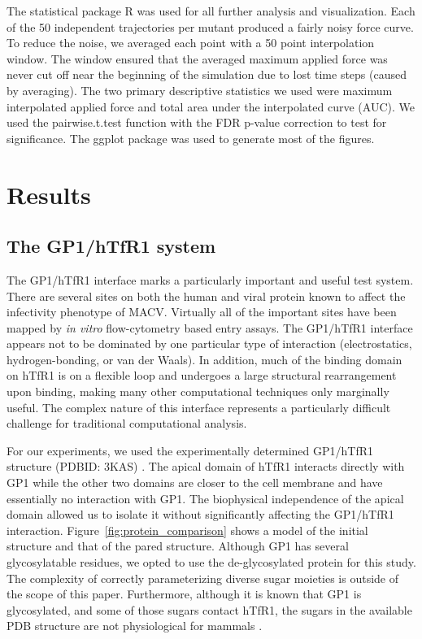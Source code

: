 \documentclass[12pt]{article} %
\providecommand{\DIFaddbegin}{} %
\providecommand{\DIFaddend}{} %
\providecommand{\DIFdelbegin}{} %
\providecommand{\DIFdelend}{} %
\begin{document}
The statistical package R was used for all further analysis and visualization. Each of the 50 independent trajectories per mutant produced a fairly noisy force curve. To reduce the noise, we averaged each point with a 50 point interpolation window. The window ensured that the averaged maximum applied force was never cut off near the beginning of the simulation due to lost time steps (caused by averaging). The two primary descriptive statistics we used were maximum interpolated applied force and total area under the interpolated curve (AUC). We used the pairwise.t.test function with the FDR p-value correction to test for significance. The ggplot \DIFdelbegin %
\DIFdelend \DIFaddbegin \citep{ggplot} \DIFaddend package was used to generate most of the figures. 

\section{Results}

\subsection{The GP1/hTfR1 system}
The GP1/hTfR1 interface marks a particularly important and useful test system. There are several sites on both the human and viral protein known to affect the infectivity phenotype of MACV. Virtually all of the important sites have been mapped by \textit{in vitro} flow-cytometry based entry assays. The GP1/hTfR1 interface appears not to be dominated by one particular type of interaction (electrostatics, hydrogen-bonding, or van der Waals). In addition, much of the binding domain on hTfR1 is on a flexible loop and undergoes a large structural rearrangement upon binding, making many other computational techniques \DIFdelbegin %
\DIFdelend \DIFaddbegin \citep{Grant2011,Kortemme2004} \DIFaddend only marginally useful. The complex nature of this interface represents a particularly difficult challenge for traditional computational analysis. 

For our experiments, we used the experimentally determined GP1/hTfR1 structure (PDBID: 3KAS) \DIFdelbegin %
\DIFdelend \DIFaddbegin \citep{Abraham2010}\DIFaddend . The apical domain of hTfR1 interacts directly with GP1 while the other two domains are closer to the cell membrane and have essentially no interaction with GP1. The biophysical independence of the apical domain allowed us to isolate it without significantly affecting the GP1/hTfR1 interaction. Figure~\ref{fig:protein_comparison} shows a model of the initial structure and that of the pared structure. Although GP1 has several glycosylatable residues, we opted to use the de-glycosylated protein for this study. The complexity of correctly parameterizing diverse sugar moieties is outside of the scope of this paper. Furthermore, although it is known that GP1 is glycosylated, and some of those sugars contact hTfR1, the sugars in the available PDB structure are not physiological for mammals \DIFdelbegin %
\DIFdelend \DIFaddbegin \citep{Abraham2010}\DIFaddend .
\end{document}
